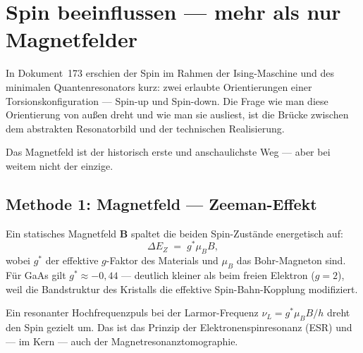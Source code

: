 
\providecommand{\ket}[1]{\left|#1\right\rangle}
\providecommand{\bra}[1]{\left\langle#1\right|}
\providecommand{\braket}[2]{\left\langle#1\middle|#2\right\rangle}

\section{Spin beeinflussen --- mehr als nur Magnetfelder}
\label{sec:spin-manipulieren}

In Dokument~173 erschien der Spin im Rahmen der Ising-Maschine und
des minimalen Quantenresonators kurz: zwei erlaubte Orientierungen
einer Torsionskonfiguration --- Spin-up und Spin-down.
Die Frage wie man diese Orientierung von außen dreht
und wie man sie ausliest, ist die Brücke zwischen dem abstrakten
Resonatorbild und der technischen Realisierung.

Das Magnetfeld ist der historisch erste und anschaulichste Weg ---
aber bei weitem nicht der einzige.

\subsection{Methode 1: Magnetfeld --- Zeeman-Effekt}
\label{sec:zeeman}

Ein statisches Magnetfeld $\mathbf{B}$ spaltet die beiden
Spin-Zustände energetisch auf:
\begin{equation}
  \Delta E_Z \;=\; g^* \mu_B B,
\end{equation}
wobei $g^*$ der effektive $g$-Faktor des Materials und
$\mu_B$ das Bohr-Magneton sind.
Für GaAs gilt $g^* \approx -0{,}44$ ---
deutlich kleiner als beim freien Elektron ($g = 2$),
weil die Bandstruktur des Kristalls die effektive
Spin-Bahn-Kopplung modifiziert.

Ein resonanter Hochfrequenzpuls bei der Larmor-Frequenz
$\nu_L = g^* \mu_B B / h$ dreht den Spin gezielt um.
Das ist das Prinzip der Elektronenspinresonanz (ESR)
und --- im Kern --- auch der Magnetresonanztomographie.

